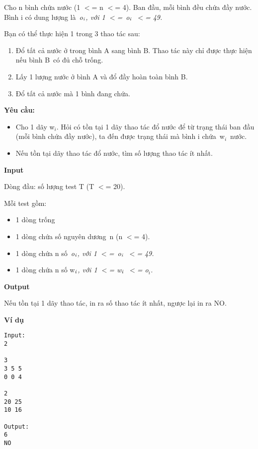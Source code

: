 

Cho n bình chứa nước (1 $<$= n $<$= 4). Ban đầu, mỗi bình đều chứa đầy nước. Bình i có dung lượng là \emph{o}$_\emph{i}$\emph{, với 1 $<$= o}$_\emph{i}$\emph{ $<$= 49.}

Bạn có thể thực hiện 1 trong 3 thao tác sau:
\begin{enumerate}
	\item Đổ tất cả nước ở trong bình A sang bình B. Thao tác này chỉ được thực hiện nếu bình B có đủ chỗ trống.
	\item Lấy 1 lượng nước ở bình A và đổ đầy hoàn toàn bình B.
	\item Đổ tất cả nước mà 1 bình đang chứa.
\end{enumerate}

\textbf{Yêu cầu: }
\begin{itemize}
	\item Cho 1 dãy w$_i$. Hỏi có tồn tại 1 dãy thao tác đổ nước để từ trạng thái ban đầu (mỗi bình chứa đầy nước), ta đến được trạng thái mà bình i chứa w$_i$ nước.
	\item Nếu tồn tại dãy thao tác đổ nước, tìm số lượng thao tác ít nhất.
\end{itemize}

\textbf{Input}

Dòng đầu: số lượng test T (T $<$= 20).

Mỗi test gồm:
\begin{itemize}
	\item 1 dòng trống
	\item 1 dòng chứa số nguyên dương n (n $<$= 4).
	\item 1 dòng chứa n số \emph{o}$_\emph{i}$\emph{, với 1 $<$= o}$_\emph{i}$\emph{ $<$= 49.}
	\item 1 dòng chứa n số w$_\emph{i}$\emph{, với 1 $<$= w}$_\emph{i}$\emph{ $<$= o$_i$.}
\end{itemize}

\textbf{Output}

Nếu tồn tại 1 dãy thao tác, in ra số thao tác ít nhất, ngược lại in ra NO.

\textbf{Ví dụ}
\begin{verbatim}
Input:
2

3
3 5 5
0 0 4

2
20 25
10 16

Output:
6
NO
\end{verbatim}